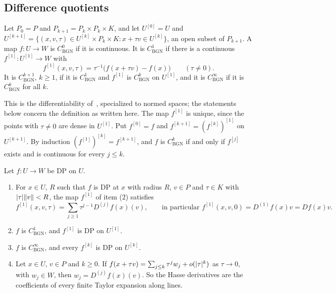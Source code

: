 \subsection{Difference quotients}\label{dp:sq:ssec-quotients}

\begin{definition}\label{dp:def:bgn}
Let $P_0=P$ and $P_{k+1}=P_k\times P_k\times K$, and let $U^{[0]}=U$ and $U^{[k+1]}=\{(x,v,\tau)\in U^{[k]}\times P_k\times K:x+\tau v\in U^{[k]}\}$, an open subset of $P_{k+1}$. A map $f\colon U\to W$ is \emph{$C^0_{\mathrm{BGN}}$} if it is continuous. It is \emph{$C^1_{\mathrm{BGN}}$} if there is a continuous $f^{[1]}\colon U^{[1]}\to W$ with
\[
 f^{[1]}(x,v,\tau)=\tau^{-1}\bigl(f(x+\tau v)-f(x)\bigr)\qquad(\tau\ne0).
\]
It is \emph{$C^{k+1}_{\mathrm{BGN}}$}, $k\ge1$, if it is $C^1_{\mathrm{BGN}}$ and $f^{[1]}$ is $C^k_{\mathrm{BGN}}$ on $U^{[1]}$, and it is \emph{$C^\infty_{\mathrm{BGN}}$} if it is $C^k_{\mathrm{BGN}}$ for all $k$.
\end{definition}

This is the differentiability of~\cite{BGN}, specialized to normed spaces; the statements below concern the definition as written here. The map $f^{[1]}$ is unique, since the points with $\tau\ne0$ are dense in $U^{[1]}$. Put $f^{[0]}=f$ and $f^{[k+1]}=(f^{[k]})^{[1]}$ on $U^{[k+1]}$. By induction $(f^{[1]})^{[k]}=f^{[k+1]}$, and $f$ is $C^k_{\mathrm{BGN}}$ if and only if $f^{[j]}$ exists and is continuous for every $j\le k$.

\begin{theorem}\label{dp:thm:bgn}
Let $f\colon U\to W$ be DP on $U$.
\begin{enumerate}
\item For $x\in U$, $R$ such that $f$ is DP at $x$ with radius $R$, $v\in P$ and $\tau\in K$ with $\lvert \tau\rvert\lVert v\rVert<R$, the map $f^{[1]}$ of item \textup{(2)} satisfies
\begin{equation}\label{dp:sq:quotient-series}
 f^{[1]}(x,v,\tau)=\sum_{j\ge1}\tau^{j-1}D^{(j)}f(x)(v),\qquad\text{in particular } f^{[1]}(x,v,0)=D^{(1)}f(x)v=Df(x)v.
\end{equation}
\item $f$ is $C^1_{\mathrm{BGN}}$, and $f^{[1]}$ is DP on $U^{[1]}$.
\item $f$ is $C^\infty_{\mathrm{BGN}}$, and every $f^{[k]}$ is DP on $U^{[k]}$.
\item Let $x\in U$, $v\in P$ and $k\ge0$. If $f(x+\tau v)=\sum_{j\le k}\tau^jw_j+o(\lvert \tau\rvert^k)$ as $\tau\to0$, with $w_j\in W$, then $w_j=D^{(j)}f(x)(v)$. So the Hasse derivatives are the coefficients of every finite Taylor expansion along lines.
\end{enumerate}
\end{theorem}

